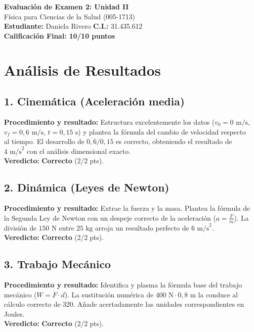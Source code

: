\documentclass[12pt,letterpaper]{article}
\begin{document}
\begin{center}
    \Large \textbf{Evaluación de Examen 2: Unidad II} \\
    \large Física para Ciencias de la Salud (005-1713) \\
    \vspace{0.5cm}
    \textbf{Estudiante:} Daniela Rivero \quad \textbf{C.I.:} 31.435.612
    \vspace{0.3cm} \\
    \large \textbf{Calificación Final: 10/10 puntos}
\end{center}

\vspace{0.5cm}

\section*{Análisis de Resultados}

\subsection*{1. Cinemática (Aceleración media)}
\textbf{Procedimiento y resultado:} Estructura excelentemente los datos ($v_0 = 0 \text{ m/s}$, $v_f = 0,6 \text{ m/s}$, $t = 0,15 \text{ s}$) y plantea la fórmula del cambio de velocidad respecto al tiempo. El desarrollo de $0,6 / 0,15$ es correcto, obteniendo el resultado de $4 \text{ m/s}^2$ con el análisis dimensional exacto. \\
\textbf{Veredicto:} \textbf{Correcto} (2/2 pts).

\subsection*{2. Dinámica (Leyes de Newton)}
\textbf{Procedimiento y resultado:} Extrae la fuerza y la masa. Plantea la fórmula de la Segunda Ley de Newton con un despeje correcto de la aceleración ($a = \frac{F}{m}$). La división de $150 \text{ N}$ entre $25 \text{ kg}$ arroja un resultado perfecto de $6 \text{ m/s}^2$. \\
\textbf{Veredicto:} \textbf{Correcto} (2/2 pts).

\subsection*{3. Trabajo Mecánico}
\textbf{Procedimiento y resultado:} Identifica y plasma la fórmula base del trabajo mecánico ($W = F \cdot d$). La sustitución numérica de $400 \text{ N} \cdot 0,8 \text{ m}$ la conduce al cálculo correcto de $320$. Añade acertadamente las unidades correspondientes en Joules. \\
\textbf{Veredicto:} \textbf{Correcto} (2/2 pts).
\end{document}
